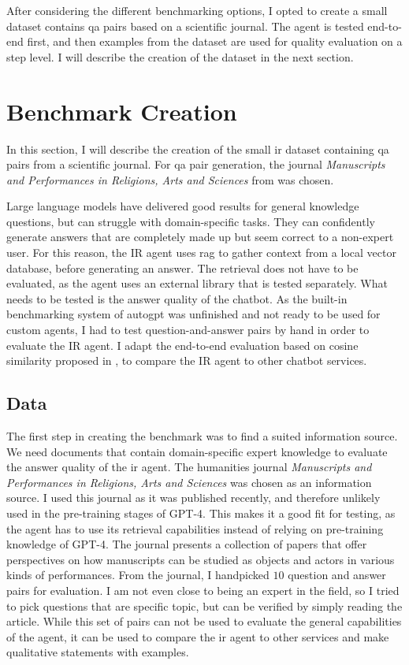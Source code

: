 \documentclass[../main.tex]{subfiles}
\begin{document}
After considering the different benchmarking options, I opted to create a small
dataset contains \gls{qa} pairs based on a scientific journal.
The agent is tested end-to-end first, and then examples from the dataset
are used for quality evaluation on a step level.
I will describe the creation of the dataset in the next section.


\section{Benchmark Creation}

In this section, I will describe the creation of the small \gls{ir} dataset
containing \gls{qa} pairs from a scientific journal.
For \gls{qa} pair generation, the journal
\emph{Manuscripts and Performances in Religions, Arts and Sciences}
from \citeauthor{Brita2023} \cite{Brita2023} was chosen.

Large language models have delivered good results for general knowledge questions,
but can struggle with domain-specific tasks.
They can confidently generate answers that are completely made up but seem correct to a non-expert user.
For this reason, the IR agent uses \gls{rag} to gather context from a local vector database,
before generating an answer.
The retrieval does not have to be evaluated, as the agent uses an external library that is tested separately.
What needs to be tested is the answer quality of the chatbot.
As the built-in benchmarking system of \gls{autogpt} was unfinished and not ready to be used for custom agents,
I had to test question-and-answer pairs by hand in order to evaluate the IR agent.
I adapt the end-to-end evaluation based on cosine similarity proposed in \cite{Banerjee2023},
to compare the IR agent to other chatbot services.

\subsection{Data}

The first step in creating the benchmark was to find a suited information source.
We need documents that contain domain-specific expert knowledge
to evaluate the answer quality of the \gls{ir} agent.
The humanities journal \emph{Manuscripts and Performances in Religions, Arts and Sciences}
\citeauthor{Brita2023} \cite{Brita2023} was chosen as an information source.
I used this journal as it was published recently,
and therefore unlikely used in the pre-training stages of GPT-4.
This makes it a good fit for testing, as the agent has to use its retrieval
capabilities instead of relying on pre-training knowledge of GPT-4.
The journal presents a collection of papers that offer perspectives on how
manuscripts can be studied as objects and actors in various kinds of performances.
From the journal, I handpicked $10$ question and answer pairs for evaluation.
I am not even close to being an expert in the field, so I tried to pick questions
that are specific topic, but can be verified by simply reading the article.
While this set of pairs can not be used to evaluate the general capabilities of the agent,
it can be used to compare the \gls{ir} agent to other services
and make qualitative statements with examples.
\end{document}
